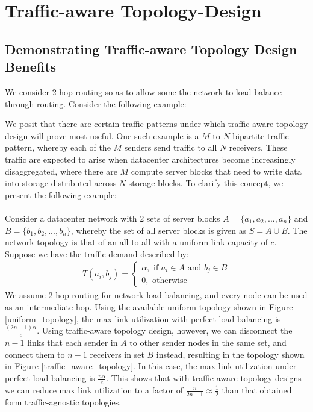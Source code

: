\documentclass[sigconf]{acmart}
\begin{document}
\section{Traffic-aware Topology-Design}
\subsection{Demonstrating Traffic-aware Topology Design Benefits}
We consider 2-hop routing so as to allow some the network to load-balance through routing. Consider the following example:


We posit that there are certain traffic patterns under which traffic-aware topology design will prove most useful. One such example is a $M$-to-$N$ bipartite traffic pattern, whereby each of the $M$ senders send traffic to all $N$ receivers. These traffic are expected to arise when datacenter architectures become increasingly disaggregated, where there are $M$ compute server blocks that need to write data into storage distributed across $N$ storage blocks. To clarify this concept, we present the following example:\\\\
Consider a datacenter network with 2 sets of server blocks $A = \{a_1, a_2, ..., a_n\}$ and $B = \{b_1, b_2, ... , b_n\}$, whereby the set of all server blocks is given as $S = A \cup B$. The network topology is that of an all-to-all with a uniform link capacity of $c$. Suppose we have the traffic demand described by:
\begin{equation}
\begin{aligned}
    T(a_i, b_j) = \begin{cases}
                \alpha, \text{ if } a_i \in A \text{ and } b_j \in B\\
                0, \text{ otherwise}
    \end{cases}
\end{aligned}
\end{equation}
We assume 2-hop routing for network load-balancing, and every node can be used as an intermediate hop. Using the available uniform topology shown in Figure \ref{uniform_topology}, the max link utilization with perfect load balancing is $\frac{(2n-1)\alpha}{c}$. Using traffic-aware topology design, however, we can disconnect the $n - 1$ links that each sender in $A$ to other sender nodes in the same set, and connect them to $n - 1$ receivers in set $B$ instead, resulting in the topology shown in Figure \ref{traffic_aware_topology}. In this case, the max link utilization under perfect load-balancing is $\frac{n \alpha}{c}$. This shows that with traffic-aware topology designs we can reduce max link utilization to a factor of $\frac{n}{2n - 1} \approx \frac{1}{2}$ than that obtained form traffic-agnostic topologies.
\end{document}
